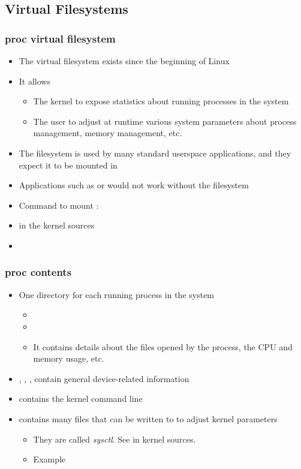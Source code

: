 \subsection{Virtual Filesystems}
\begin{frame}
  \frametitle{proc virtual filesystem}
  \begin{itemize}
  \item The  virtual filesystem exists since the beginning of
    Linux
  \item It allows
    \begin{itemize}
    \item The kernel to expose statistics about running processes in
      the system
    \item The user to adjust at runtime various system parameters
      about process management, memory management, etc.
    \end{itemize}
  \item The  filesystem is used by many standard userspace
    applications, and they expect it to be mounted in 
  \item Applications such as  or  would not work
    without the  filesystem
  \item Command to mount :\\
  \item {} in the kernel sources
  \item {}
  \end{itemize}
\end{frame}

\begin{frame}
  \frametitle{proc contents}
  \begin{itemize}
  \item One directory for each running process in the system
    \begin{itemize}
    \item {}
    \item {}
    \item It contains details about the files opened by the process,
      the CPU and memory usage, etc.
    \end{itemize}
  \item {}, ,
    ,  contain general
    device-related information
  \item {} contains the kernel command line
  \item {} contains many files that can be written to to
    adjust kernel parameters
    \begin{itemize}
    \item They are called {\em sysctl}. See 
      in kernel sources.
    \item Example\\
    \end{itemize}
  \end{itemize}
\end{frame}

